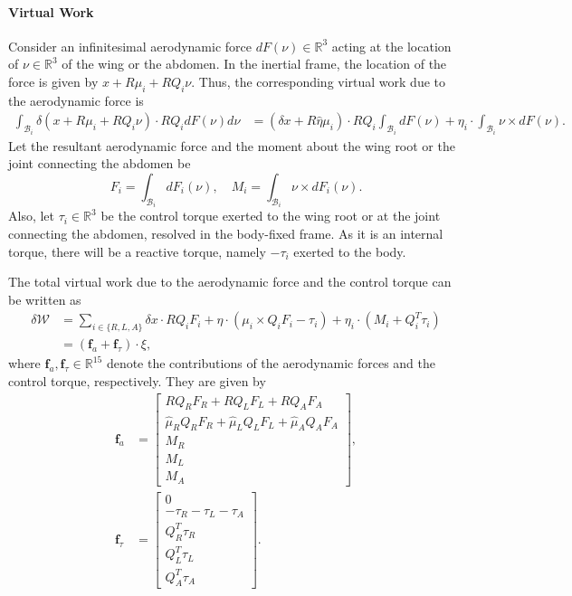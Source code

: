 \documentclass[10pt]{article}
\renewcommand{\Re}{\ensuremath{\mathbb{R}}}
\begin{document}
\paragraph{Virtual Work}

Consider an infinitesimal aerodynamic force $dF(\nu)\in\Re^3$ acting at the location of $\nu\in\Re^3$ of the wing or the abdomen. 
In the inertial frame, the location of the force is given by $x+ R\mu_i + R Q_i\nu$. 
Thus, the corresponding virtual work due to the aerodynamic force is
\begin{align*}
    \int_{\mathcal{B}_i} \delta(x + R\mu_i + R Q_i\nu) \cdot R Q_i dF(\nu) d\nu
                      & =  (\delta x + R\hat\eta \mu_i) \cdot R Q_i \int_{\mathcal{B}_i} dF(\nu) + \eta_i \cdot \int_{\mathcal{B}_i} \nu \times dF(\nu).
\end{align*}
Let the resultant aerodynamic force and the moment about the wing root or the joint connecting the abdomen be
\[
    F_i = \int_{\mathcal{B}_i} dF_i(\nu) ,\quad M_i = \int_{\mathcal{B}_i} \nu\times dF_i(\nu).
\]
Also, let $\tau_i\in\Re^3$ be the control torque exerted to the wing root or at the joint connecting the abdomen, resolved in the body-fixed frame. 
As it is an internal torque, there will be a reactive torque, namely $-\tau_i$ exerted to the body. 

The total virtual work due to the aerodynamic force and the control torque can be written as
\begin{align}
    \delta\mathcal{W} & = \sum_{i\in\{R,L,A\}} \delta x \cdot R Q_i F_i + \eta\cdot (\mu_i\times Q_i F_i -\tau_i) + \eta_i \cdot ( M_i+ Q_i^T \tau_i) \nonumber \\
                      & = (\mathbf{f}_{a} + \mathbf{f}_\tau)  \cdot \xi,
\end{align}
where $\mathbf{f}_a, \mathbf{f}_\tau \in\Re^{15}$ denote the contributions of the aerodynamic forces and the control torque, respectively. 
They are given by
\begin{align}
    \mathbf{f}_a & = 
    \begin{bmatrix}
        RQ_R F_R  + R Q_L F_L + R Q_A F_A \\
        \hat \mu_R Q_RF_R + \hat\mu_L Q_L F_L + \hat\mu_A Q_A F_A \\
        M_R  \\
        M_L  \\
        M_A   
    \end{bmatrix},\\
    \mathbf{f}_\tau & = 
    \begin{bmatrix}
        0 \\
         -\tau_R  -\tau_L  -\tau_A \\
        Q_R^T \tau_R \\
        Q_L^T \tau_L \\
        Q_A^T \tau_A
    \end{bmatrix}.\label{eqn:f_tau}
\end{align}
\end{document}
